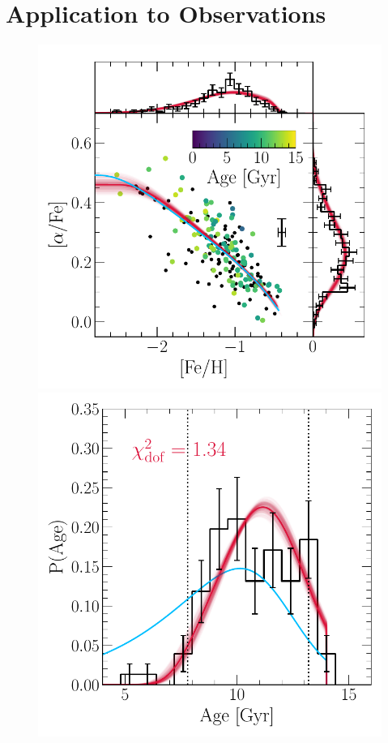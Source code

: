 \documentclass[ms.tex]{subfiles}
\begin{document}
\section{Application to Observations}
\label{sec:h3}

\begin{figure}
\includegraphics[scale = 0.5]{gsefit_afe_feh.pdf}
\includegraphics[scale = 0.42]{gsefit_agedist.pdf}

\end{figure}
\end{document}
